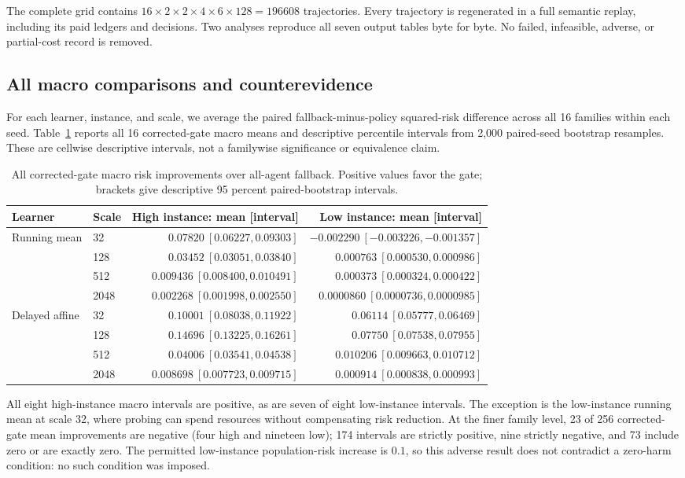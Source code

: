 \documentclass[journal]{IEEEtran}
\begin{document}
The complete grid contains $16\times2\times2\times4\times6\times128=196608$ trajectories.
Every trajectory is regenerated in a full semantic replay, including its paid ledgers and decisions.
Two analyses reproduce all seven output tables byte for byte.
No failed, infeasible, adverse, or partial-cost record is removed.

\subsection{All macro comparisons and counterevidence}
For each learner, instance, and scale, we average the paired fallback-minus-policy squared-risk difference across all 16 families within each seed.
Table~\ref{tab:direct-macro} reports all 16 corrected-gate macro means and descriptive percentile intervals from 2,000 paired-seed bootstrap resamples.
These are cellwise descriptive intervals, not a familywise significance or equivalence claim.
\begin{table}[t]
\centering
\caption{All corrected-gate macro risk improvements over all-agent fallback.
Positive values favor the gate; brackets give descriptive 95 percent paired-bootstrap intervals.}
\label{tab:direct-macro}
\begin{tabular}{llrr}
\toprule
Learner & Scale & High instance: mean [interval] & Low instance: mean [interval] \\
\midrule
Running mean & 32 & $0.07820\ [0.06227,0.09303]$ & $-0.002290\ [-0.003226,-0.001357]$ \\
& 128 & $0.03452\ [0.03051,0.03840]$ & $0.000763\ [0.000530,0.000986]$ \\
& 512 & $0.009436\ [0.008400,0.010491]$ & $0.000373\ [0.000324,0.000422]$ \\
& 2048 & $0.002268\ [0.001998,0.002550]$ & $0.0000860\ [0.0000736,0.0000985]$ \\
Delayed affine & 32 & $0.10001\ [0.08038,0.11922]$ & $0.06114\ [0.05777,0.06469]$ \\
& 128 & $0.14696\ [0.13225,0.16261]$ & $0.07750\ [0.07538,0.07955]$ \\
& 512 & $0.04006\ [0.03541,0.04538]$ & $0.010206\ [0.009663,0.010712]$ \\
& 2048 & $0.008698\ [0.007723,0.009715]$ & $0.000914\ [0.000838,0.000993]$ \\
\bottomrule
\end{tabular}
\end{table}

All eight high-instance macro intervals are positive, as are seven of eight low-instance intervals.
The exception is the low-instance running mean at scale 32, where probing can spend resources without compensating risk reduction.
At the finer family level, 23 of 256 corrected-gate mean improvements are negative (four high and nineteen low); 174 intervals are strictly positive, nine strictly negative, and 73 include zero or are exactly zero.
The permitted low-instance population-risk increase is $0.1$, so this adverse result does not contradict a zero-harm condition: no such condition was imposed.
\end{document}
